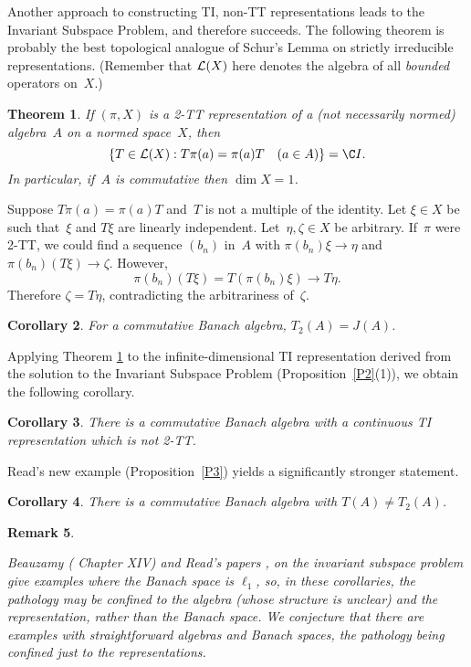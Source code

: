 \documentclass[11pt]{article}
\newtheorem{thm}{Theorem}[section]
\newtheorem{cor}[thm]{Corollary}
\newenvironment{Proof}{{\it Proof. }}{}%
\newtheorem{remk}[thm]{Remark}
\newenvironment{Remark}{\begin{remk}\begin{rm}}{\end{rm}\end{remk}}
\newcommand{\LX}{{\cal L}(X)}
\begin{document}
Another approach to constructing TI, non-TT representations
leads to the Invariant Subspace Problem, and therefore succeeds.
The following theorem is probably the best topological analogue of Schur's Lemma
on strictly irreducible representations.    (Remember that $\LX$ here denotes
the algebra of all {\em bounded} operators on~$X$.)

\begin{thm}\label{T1}
If $(\pi,X)$ is a 2-TT representation of a (not
necessarily normed) algebra~$A$ on a normed space~$X$, then
$$\{T \in \LX: T\pi(a) = \pi(a)T\quad(a \in A)\} = \C I.$$
In particular, if~$A$ is commutative then $\dim X = 1$.
\end{thm}

\begin{Proof}
Suppose $T\pi(a) = \pi(a)T$ and~$T$ is not a multiple of the identity.
Let $\xi \in X$ be such that~$\xi$
and $T\xi$ are linearly independent.    Let~$\eta,\zeta \in X$ be
arbitrary.    If~$\pi$ were 2-TT, we could find a sequence
$(b_n)$ in~$A$ with $\pi(b_n)\xi \to \eta$ and $\pi(b_n)(T\xi) \to \zeta$.
However,
$$\pi(b_n)(T\xi) = T(\pi(b_n)\xi) \to T\eta.$$
Therefore $\zeta = T\eta$, contradicting the arbitrariness of~$\zeta$.
\end{Proof}

\begin{cor}\label{C2b}
For a commutative Banach algebra, $T_2(A) = J(A)$.
\end{cor}

Applying Theorem \ref{T1} to the infinite-dimensional TI representation derived
from the solution to the Invariant Subspace Problem (Proposition~\ref{P2}(1)),
we obtain the following corollary.

\begin{cor}\label{C2}
There is a commutative Banach algebra with a continuous TI representation
which is not 2-TT.
\end{cor}

Read's new example (Proposition~\ref{P3}) yields a significantly stronger
statement.

\begin{cor}\label{C2a}
There is a commutative Banach algebra with $T(A) \ne T_2(A)$.
\end{cor}

\begin{Remark}
Beauzamy (\cite{Beauzamy} Chapter XIV) and Read's papers \cite{Readl1},
\cite{Readqn} on the invariant subspace problem give examples where the Banach
space is $\ell_1$, so, in these corollaries, the pathology may be confined to
the algebra (whose structure is unclear) and the representation, rather than the
Banach space.   We conjecture that there are examples with straightforward
algebras and Banach spaces, the pathology being confined just to the
representations.
\end{Remark}
\end{document}
